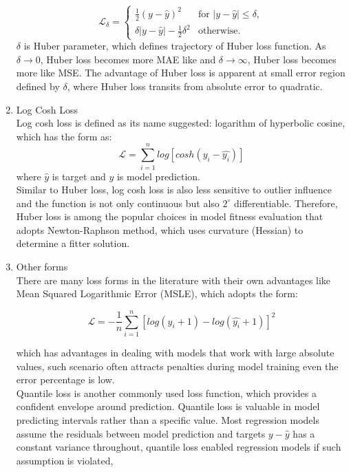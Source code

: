\begin{enumerate}
\begin{equation}
    \mathcal{L}_\delta = \left\{ 
    \begin{array}{ll}
        \frac {1}{2} (y - \hat{y})^2 & \text{for } |y-\hat{y}| \leq \delta, \\
        \delta |y - \hat{y}| - \frac{1}{2} \delta^2 & \text{otherwise.} 
    \end{array}\right.
\end{equation}
$\delta$ is Huber parameter, which defines trajectory of Huber loss function. As $\delta \rightarrow 0$, Huber loss becomes more MAE like and $\delta \rightarrow \infty$, Huber loss becomes more like MSE. The advantage of Huber loss is apparent at small error region defined by $\delta$, where Huber loss transits from absolute error to quadratic. 
    \item Log Cosh Loss \\
Log cosh loss is defined as its name suggested: logarithm of hyperbolic cosine, which has the form as:
\begin{equation}
    \mathcal{L} = \sum_{i=1}^n log[cosh(y_i-\hat{y_i})]
\end{equation}
where $\hat{y}$ is target and $y$ is model prediction. \\
Similar to Huber loss, log cosh loss is also less sensitive to outlier influence and the function is not only continuous but also $2^{\circ}$ differentiable. Therefore, Huber loss is among the popular choices in model fitness evaluation that adopts Newton-Raphson method, which uses curvature (Hessian) to determine a fitter solution. 
    \item Other forms\\
There are many loss forms in the literature with their own advantages like Mean Squared Logarithmic Error (MSLE), which adopts the form:

\begin{equation}
    \mathcal{L} = -\frac{1}{n}\sum_{i=1}^n [log (y_i + 1) -  log(\hat{y_i} + 1) ]^2 
\end{equation}

which has advantages in dealing with models that work with large absolute values, such scenario often attracts penalties during model training even the error percentage is low. \\
Quantile loss is another commonly used loss function, which provides a confident envelope around prediction. Quantile loss is valuable in model predicting intervals rather than a specific value. Most regression models assume the residuals between model prediction and targets $y-\hat{y}$ has a constant variance throughout, quantile loss enabled regression models if such assumption is violated, 
\end{enumerate}